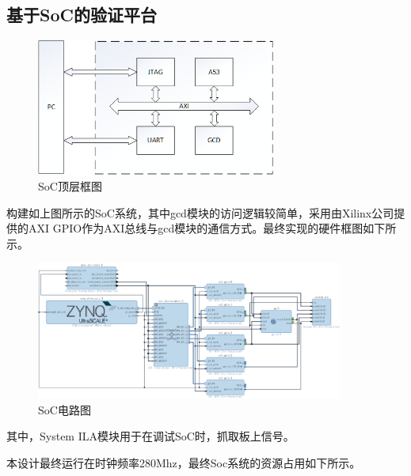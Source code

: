 \documentclass[12pt]{article}
\begin{document}
\subsection{基于SoC的验证平台}
\begin{figure}[H]
\begin{center}
\includegraphics[width=0.7\textwidth]{./highperformance/SoCArchitecture.png}
\caption{SoC顶层框图}
\label{SoCArchitecture}
\end{center}
\end{figure}
构建如上图所示的SoC系统，其中gcd模块的访问逻辑较简单，采用由Xilinx公司提供的AXI GPIO作为AXI总线与gcd模块的通信方式。最终实现的硬件框图如下所示。
\begin{figure}[H]
\begin{center}
\includegraphics[width=0.9\textwidth]{./highperformance/SoCSchematic.png}
\caption{SoC电路图}
\label{SoCSchematic}
\end{center}
\end{figure}
其中，System ILA模块用于在调试SoC时，抓取板上信号。

本设计最终运行在时钟频率280Mhz，最终Soc系统的资源占用如下所示。
\end{document}
